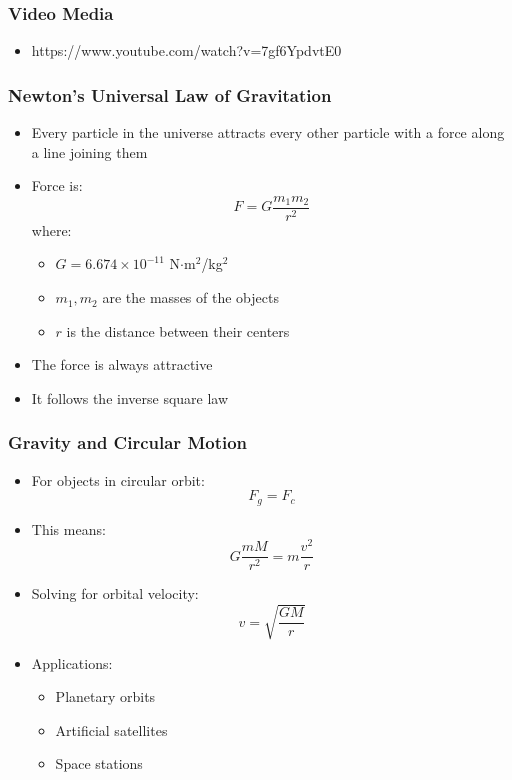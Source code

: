 \documentclass{beamer}
\begin{document}
\begin{frame}
\frametitle{Video Media}
\begin{itemize}
 \item https://www.youtube.com/watch?v=7gf6YpdvtE0
\end{itemize}
\end{frame}

\begin{frame}
\frametitle{Newton's Universal Law of Gravitation}
\begin{itemize}
    \item Every particle in the universe attracts every other particle with a force along a line joining them
    \item Force is:
        \[ F = G\frac{m_1m_2}{r^2} \]
    where:
    \begin{itemize}
        \item $G = 6.674 \times 10^{-11}$ N$\cdot$m$^2$/kg$^2$
        \item $m_1, m_2$ are the masses of the objects
        \item $r$ is the distance between their centers
    \end{itemize}
    \item The force is always attractive
    \item It follows the inverse square law
\end{itemize}
\end{frame}

\begin{frame}
\frametitle{Gravity and Circular Motion}
\begin{itemize}
    \item For objects in circular orbit:
        \[ F_g = F_c \]
    \item This means:
        \[ G\frac{mM}{r^2} = m\frac{v^2}{r} \]
    \item Solving for orbital velocity:
        \[ v = \sqrt{\frac{GM}{r}} \]
    \item Applications:
    \begin{itemize}
        \item Planetary orbits
        \item Artificial satellites
        \item Space stations
    \end{itemize}
\end{itemize}
\end{frame}
\end{document}
